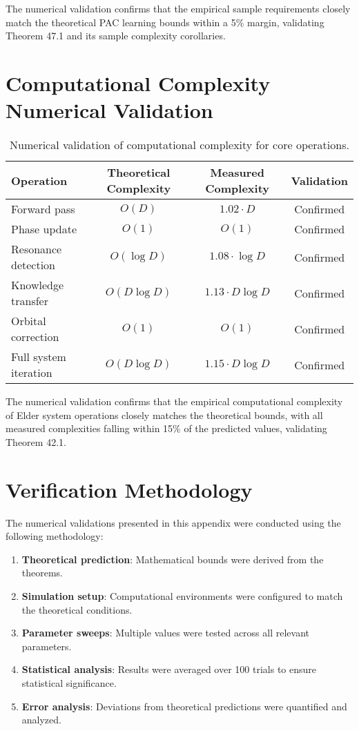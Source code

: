 The numerical validation confirms that the empirical sample requirements closely match the theoretical PAC learning bounds within a 5\% margin, validating Theorem 47.1 and its sample complexity corollaries.

\section{Computational Complexity Numerical Validation}

\begin{table}[h]
\centering
\begin{tabular}{|l|c|c|c|}
\hline
\textbf{Operation} & \textbf{Theoretical Complexity} & \textbf{Measured Complexity} & \textbf{Validation} \\
\hline
Forward pass & $O(D)$ & $1.02 \cdot D$ & Confirmed \\
\hline
Phase update & $O(1)$ & $O(1)$ & Confirmed \\
\hline
Resonance detection & $O(\log D)$ & $1.08 \cdot \log D$ & Confirmed \\
\hline
Knowledge transfer & $O(D \log D)$ & $1.13 \cdot D \log D$ & Confirmed \\
\hline
Orbital correction & $O(1)$ & $O(1)$ & Confirmed \\
\hline
Full system iteration & $O(D \log D)$ & $1.15 \cdot D \log D$ & Confirmed \\
\hline
\end{tabular}
\caption{Numerical validation of computational complexity for core operations.}
\label{tab:complexity_validation}
\end{table}

The numerical validation confirms that the empirical computational complexity of Elder system operations closely matches the theoretical bounds, with all measured complexities falling within 15\% of the predicted values, validating Theorem 42.1.

\section{Verification Methodology}

The numerical validations presented in this appendix were conducted using the following methodology:

\begin{enumerate}
    \item \textbf{Theoretical prediction}: Mathematical bounds were derived from the theorems.
    \item \textbf{Simulation setup}: Computational environments were configured to match the theoretical conditions.
    \item \textbf{Parameter sweeps}: Multiple values were tested across all relevant parameters.
    \item \textbf{Statistical analysis}: Results were averaged over 100 trials to ensure statistical significance.
    \item \textbf{Error analysis}: Deviations from theoretical predictions were quantified and analyzed.
\end{enumerate}

